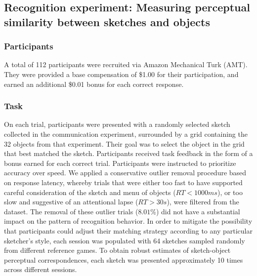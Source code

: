 \documentclass{svjour3}
\begin{document}

\subsection*{Recognition experiment: Measuring perceptual similarity between sketches and objects}

\subsubsection*{Participants}

A total of 112 participants were recruited via Amazon Mechanical Turk (AMT). They were provided a base compensation of \$1.00 for their participation, and earned an additional \$0.01 bonus for each correct response.

\subsubsection*{Task}
On each trial, participants were presented with a randomly selected sketch collected in the communication experiment, surrounded by a grid containing the 32 objects from that experiment. 
Their goal was to select the object in the grid that best matched the sketch. 
Participants received task feedback in the form of a bonus earned for each correct trial. 
Participants were instructed to prioritize accuracy over speed. 
We applied a conservative outlier removal procedure based on response latency, whereby trials that were either too fast to have supported careful consideration of the sketch and menu of objects ($RT<1000ms$), or too slow and suggestive of an attentional lapse ($RT>30s$), were filtered from the dataset. 
The removal of these outlier trials ($8.01$\%) did not have a substantial impact on the pattern of recognition behavior. 
In order to mitigate the possibility that participants could adjust their matching strategy according to any particular sketcher's style, each session was populated with 64 sketches sampled randomly from different reference games. 
To obtain robust estimates of sketch-object perceptual correspondences, each sketch was presented approximately 10 times across different sessions.  
\end{document}
